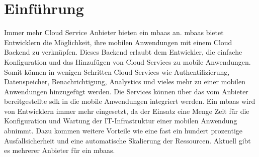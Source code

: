 \section{Einführung}
Immer mehr Cloud Service Anbieter bieten ein \gls{mbaas} an. \gls{mbaas} bietet Entwicklern die Möglichkeit, ihre mobilen Anwendungen mit einem Cloud Backend zu verknüpfen. Dieses Backend erlaubt dem Entwickler, die einfache Konfiguration und das Hinzufügen von Cloud Services zu mobile Anwendungen. Somit können in wenigen Schritten Cloud Services wie Authentifizierung, Datenspeicher, Benachrichtigung, Analystics und vieles mehr zu einer mobilen Anwendungen hinzugefügt werden. Die Services können über das vom Anbieter bereitgestellte \gls{sdk} in die mobile Anwendungen integriert werden. Ein \gls{mbaas} wird von Entwicklern immer mehr eingesetzt, da der Einsatz eine Menge Zeit für die Konfiguration und Wartung der IT-Infrastruktur einer mobilen Anwendung abnimmt. Dazu kommen weitere Vorteile wie eine fast ein hundert prozentige Ausfallsicherheit und eine automatische Skalierung der Ressourcen. Aktuell gibt es mehrerer Anbieter für ein \gls{mbaas}.

